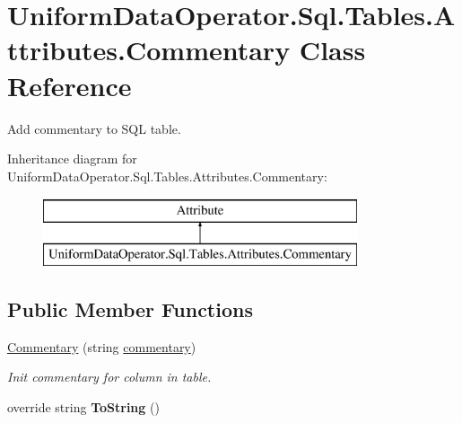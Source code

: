 \hypertarget{class_uniform_data_operator_1_1_sql_1_1_tables_1_1_attributes_1_1_commentary}{}\section{Uniform\+Data\+Operator.\+Sql.\+Tables.\+Attributes.\+Commentary Class Reference}
\label{class_uniform_data_operator_1_1_sql_1_1_tables_1_1_attributes_1_1_commentary}


Add commentary to S\+QL table.  


Inheritance diagram for Uniform\+Data\+Operator.\+Sql.\+Tables.\+Attributes.\+Commentary\+:\begin{figure}[H]
\begin{center}
\leavevmode
\includegraphics[height=2.000000cm]{df/da1/class_uniform_data_operator_1_1_sql_1_1_tables_1_1_attributes_1_1_commentary}
\end{center}
\end{figure}
\subsection*{Public Member Functions}
\begin{DoxyCompactItemize}
\item 
\mbox{\hyperlink{class_uniform_data_operator_1_1_sql_1_1_tables_1_1_attributes_1_1_commentary_a783f8260ef410428b29e9c3b9e5f22b4}{Commentary}} (string \mbox{\hyperlink{class_uniform_data_operator_1_1_sql_1_1_tables_1_1_attributes_1_1_commentary_ae5b1dba615a813beddea425d35297e54}{commentary}})
\begin{DoxyCompactList}\small\item\em Init commentary for column in table. \end{DoxyCompactList}\item 
\mbox{\label{class_uniform_data_operator_1_1_sql_1_1_tables_1_1_attributes_1_1_commentary_a87f7ce2472c0f393223aecb51f4a8463}} 
override string {\bfseries To\+String} ()
\end{DoxyCompactItemize}
